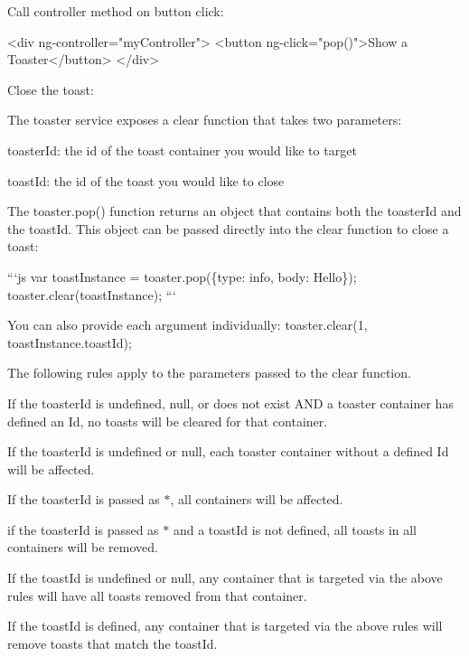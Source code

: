 \begin{DoxyItemize}
\item Call controller method on button click\+:
\end{DoxyItemize}


\begin{DoxyCode}
<div ng-controller="myController">
    <button ng-click="pop()">Show a Toaster</button>
</div>
\end{DoxyCode}



\begin{DoxyItemize}
\item Close the toast\+:

The {\ttfamily toaster} service exposes a {\ttfamily clear} function that takes two parameters\+:
\begin{DoxyItemize}
\item {\ttfamily toaster\+Id}\+: the id of the toast container you would like to target
\item {\ttfamily toast\+Id}\+: the id of the toast you would like to close
\end{DoxyItemize}

The {\ttfamily toaster.\+pop()} function returns an object that contains both the toaster\+Id and the toast\+Id. This object can be passed directly into the {\ttfamily clear} function to close a toast\+:

```js var toast\+Instance = toaster.\+pop(\{type\+: \textquotesingle{}info\textquotesingle{}, body\+: \textquotesingle{}Hello\textquotesingle{}\}); toaster.\+clear(toast\+Instance); ```

You can also provide each argument individually\+: {\ttfamily toaster.\+clear(1, toast\+Instance.\+toast\+Id);}

The following rules apply to the parameters passed to the {\ttfamily clear} function.
\begin{DoxyItemize}
\item If the {\ttfamily toaster\+Id} is undefined, null, or does not exist A\+ND a toaster container has defined an Id, no toasts will be cleared for that container.
\item If the {\ttfamily toaster\+Id} is undefined or null, each toaster container without a defined Id will be affected.
\item If the {\ttfamily toaster\+Id} is passed as {\ttfamily $\ast$}, all containers will be affected.
\item if the {\ttfamily toaster\+Id} is passed as {\ttfamily $\ast$} and a {\ttfamily toast\+Id} is not defined, all toasts in all containers will be removed.
\item If the {\ttfamily toast\+Id} is undefined or null, any container that is targeted via the above rules will have all toasts removed from that container.
\item If the {\ttfamily toast\+Id} is defined, any container that is targeted via the above rules will remove toasts that match the {\ttfamily toast\+Id}.
\end{DoxyItemize}
\end{DoxyItemize}

